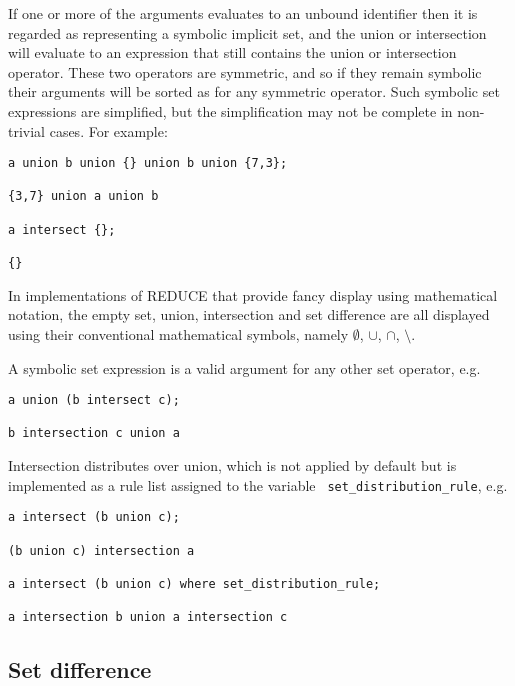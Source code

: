 If one or more of the arguments evaluates to an unbound identifier
then it is regarded as representing a symbolic implicit set, and the
union or intersection will evaluate to an expression that still
contains the union or intersection operator.  These two operators are
symmetric, and so if they remain symbolic their arguments will be
sorted as for any symmetric operator.  Such symbolic set expressions
are simplified, but the simplification may not be complete in
non-trivial cases.  For example:
\begin{verbatim}
a union b union {} union b union {7,3};

{3,7} union a union b

a intersect {};

{}
\end{verbatim}

In implementations of REDUCE that provide fancy display using
mathematical notation, the empty set, union, intersection and set
difference are all displayed using their conventional mathematical
symbols, namely $\emptyset$, $\cup$, $\cap$, $\setminus$.

A symbolic set expression is a valid argument for any other set
operator, e.g.
\begin{verbatim}
a union (b intersect c);

b intersection c union a
\end{verbatim}

Intersection distributes over union, which is not applied by default
but is implemented as a rule list assigned to the variable {\tt
set\_distribution\_rule}, e.g.
\begin{verbatim}
a intersect (b union c);

(b union c) intersection a

a intersect (b union c) where set_distribution_rule;

a intersection b union a intersection c
\end{verbatim}


\subsection{Set difference}

